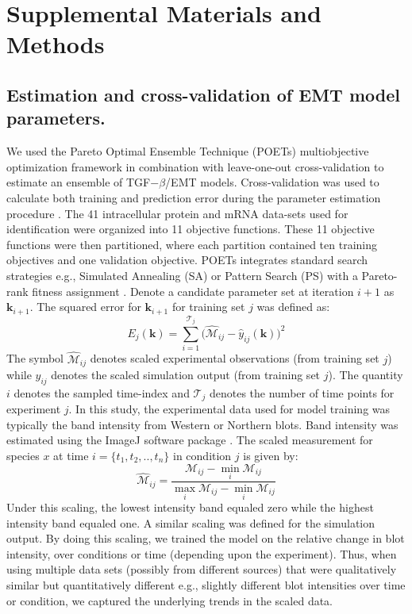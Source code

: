 \section*{Supplemental Materials and Methods}

\subsection*{Estimation and cross-validation of EMT model parameters.}
We used the Pareto Optimal Ensemble Technique (POETs) multiobjective optimization framework in combination with leave-one-out cross-validation to estimate an ensemble of TGF$-\beta$/EMT models.
Cross-validation was used to calculate both training and prediction error during the parameter estimation procedure \citep{kohavi1995study}.
The 41 intracellular protein and mRNA data-sets used for identification were organized into 11 objective functions.
These 11 objective functions were then partitioned, where each partition contained ten training objectives and one validation objective.
POETs integrates standard search strategies e.g., Simulated Annealing (SA) or Pattern Search (PS)
with a Pareto-rank fitness assignment \citep{Song:2010fk,JuPOETs-BioArXiv}.
Denote a candidate parameter set at iteration $i+1$ as $\mathbf{k}_{i+1}$.
The squared error for $\mathbf{k}_{i+1}$ for training set $j$ was defined as:
\begin{equation}\label{eqn_cost2}
	E_{j}(\mathbf{k}) = \sum_{i=1}^{\mathcal{T}_{j}}\biggl(\hat{\mathcal{M}}_{ij}-\hat{y}_{ij}(\mathbf{k})\biggr)^2
\end{equation}
The symbol $\hat{\mathcal{M}}_{ij}$ denotes scaled experimental observations (from training set $j$) while $\hat{y}_{ij}$ denotes the scaled simulation output (from training set $j$).
The quantity $i$ denotes the sampled time-index and $\mathcal{T}_{j}$ denotes the number of time points for experiment $j$.
In this study, the experimental data used for model training was typically the band intensity from Western or Northern blots.
Band intensity was estimated using the ImageJ software package \cite{IMAGEJ}.
The scaled measurement for species $x$ at time $i=\{t_{1},t_{2},..,t_{n}\}$ in condition $j$ is given by:
\begin{equation}\label{norm_exp_data}
\hat{\mathcal{M}}_{ij} = \frac{\mathcal{M}_{ij} - \min_{i}\mathcal{M}_{ij}}{\max_{i}{\mathcal{M}_{ij}}-\min_{i}{\mathcal{M}_{ij}}}
\end{equation}
Under this scaling, the lowest intensity band equaled zero while the highest intensity band equaled one.
A similar scaling was defined for the simulation output. By doing this scaling, we trained the model on the relative change in blot intensity, over conditions or time (depending upon the experiment). Thus, when using multiple data sets (possibly from different sources) that were qualitatively similar but quantitatively different e.g., slightly different blot intensities over time or condition, we captured the underlying trends in the scaled data.

